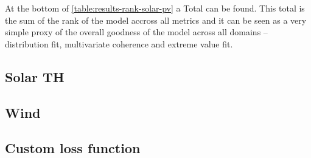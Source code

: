 At the bottom of \autoref{table:results-rank-solar-pv} a Total can be found. This total is the sum of the rank of the model accross all metrics and it can be seen as a very simple proxy of the overall goodness of the model across all domains -- distribution fit, multivariate coherence and extreme value fit. 

\subsection{Solar TH}
\subsection{Wind}
\subsection{Custom loss function}